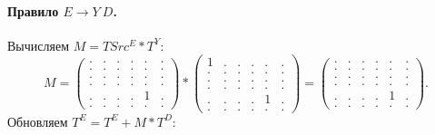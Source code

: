 \paragraph{Правило $E \to Y\ D$.}
Вычисляем $M = TSrc^E * T^Y$:
{
    \renewcommand{\arraystretch}{0.7}
    \setlength\arraycolsep{2pt}
\[
    M =
    \begin{pmatrix}
    . & . & . & . & . & . \\
    . & . & . & . & . & . \\
    . & . & . & . & . & . \\
    . & . & . & . & . & . \\
    . & . & . & . & 1 & . \\
    . & . & . & . & . & .
    \end{pmatrix} *
    \begin{pmatrix}
    1 & . & . & . & . & . \\
    . & . & . & . & . & . \\
    . & . & . & . & . & . \\
    . & . & . & . & . & . \\
    . & . & . & . & 1 & . \\
    . & . & . & . & . & .
    \end{pmatrix} =
    \begin{pmatrix}
    . & . & . & . & . & . \\
    . & . & . & . & . & . \\
    . & . & . & . & . & . \\
    . & . & . & . & . & . \\
    . & . & . & . & 1 & . \\
    . & . & . & . & . & .
    \end{pmatrix}.
\]
}
Обновляем $T^E = T^E + M * T^D$:
